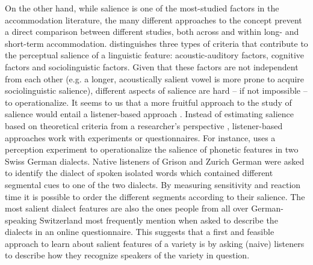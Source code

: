 \documentclass[output=paper,
modfonts
]{langscibook}
\begin{document}
On the other hand, while salience is one of the most-studied factors in the accommodation literature, the many different approaches to the concept prevent a direct comparison between different studies, both across and within long- and short-term accommodation. \cite{auer_anmerkungen_2014} distinguishes three types of criteria that contribute to the perceptual salience of a linguistic feature: acoustic-auditory factors, cognitive factors and sociolinguistic factors. Given that these factors are not independent from each other (e.g. a longer, acoustically salient vowel is more prone to acquire sociolinguistic salience), different aspects of salience are hard – if not impossible – to operationalize. It seems to us that a more fruitful approach to the study of salience would entail a listener-based approach \citep{macleod_critical_2015,ruch_role_2018}. Instead of estimating salience based on theoretical criteria from a researcher's perspective \citep{auer_subjective_1998,trudgill_dialects_1986}, listener-based approaches work with experiments or questionnaires. For instance, \cite{ruch_role_2018} uses a perception experiment to operationalize the salience of phonetic features in two Swiss German dialects. Native listeners of Grison and Zurich German were asked to identify the dialect of spoken isolated words which contained different segmental cues to one of the two dialects. By measuring sensitivity and reaction time it is possible to order the different segments according to their salience. The most salient dialect features are also the ones people from all over German-speaking Switzerland most frequently mention when asked to describe the dialects in an online questionnaire. This suggests that a first and feasible approach to learn about salient features of a variety is by asking (naive) listeners to describe  how they recognize speakers of the variety in question. 
% 
% 
% 
% 
% 
%
\end{document}
